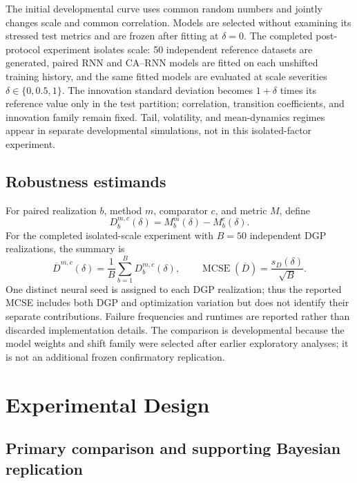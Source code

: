 \documentclass[11pt]{article}
\begin{document}
The initial developmental curve uses common random numbers and jointly changes
scale and common correlation. Models are selected without examining its stressed
test metrics and are frozen after fitting at $\delta=0$. The completed
post-protocol experiment isolates scale: 50 independent reference datasets are
generated, paired RNN and CA--RNN models are fitted on each unshifted training
history, and the same fitted models are evaluated at scale severities
$\delta\in\{0,0.5,1\}$. The innovation standard deviation becomes $1+\delta$
times its reference value only in the test partition; correlation, transition
coefficients, and innovation family remain fixed. Tail, volatility, and
mean-dynamics regimes appear in separate developmental simulations, not in this
isolated-factor experiment.

\subsection{Robustness estimands}

For paired realization $b$, method $m$, comparator $c$, and metric $M$, define
\[
D_b^{m,c}(\delta)=M_b^m(\delta)-M_b^c(\delta).
\]
For the completed isolated-scale experiment with $B=50$ independent DGP
realizations, the summary is
\[
\overline D^{m,c}(\delta)=\frac1B\sum_{b=1}^B D_b^{m,c}(\delta),
\qquad
\operatorname{MCSE}(\overline D)=
\frac{s_D(\delta)}{\sqrt B}.
\]
One distinct neural seed is assigned to each DGP realization; thus the reported
MCSE includes both DGP and optimization variation but does not identify their
separate contributions. Failure frequencies and runtimes are reported rather
than discarded implementation details. The comparison is developmental because
the model weights and shift family were selected after earlier exploratory
analyses; it is not an additional frozen confirmatory replication.

\section{Experimental Design}

\subsection{Primary comparison and supporting Bayesian replication}
\end{document}
